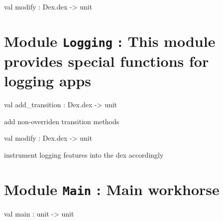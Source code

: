 \documentclass[11pt]{article}
\begin{document}
\ocamldocvspace{0.5cm}



\label{val:Testing.modify}\begin{ocamldoccode}
val modify : Dex.dex -> unit
\end{ocamldoccode}


\section{Module {\tt{Logging}} : This module provides special functions for logging apps}
\label{module:Logging}




\ocamldocvspace{0.5cm}



\label{val:Logging.add-underscoretransition}\begin{ocamldoccode}
val add_transition : Dex.dex -> unit
\end{ocamldoccode}
\begin{ocamldocdescription}
add non-overriden transition methods


\end{ocamldocdescription}




\label{val:Logging.modify}\begin{ocamldoccode}
val modify : Dex.dex -> unit
\end{ocamldoccode}
\begin{ocamldocdescription}
instrument logging features into the dex accordingly


\end{ocamldocdescription}


\section{Module {\tt{Main}} : Main workhorse}
\label{module:Main}




\ocamldocvspace{0.5cm}



\label{val:Main.main}\begin{ocamldoccode}
val main : unit -> unit
\end{ocamldoccode}
\end{document}

